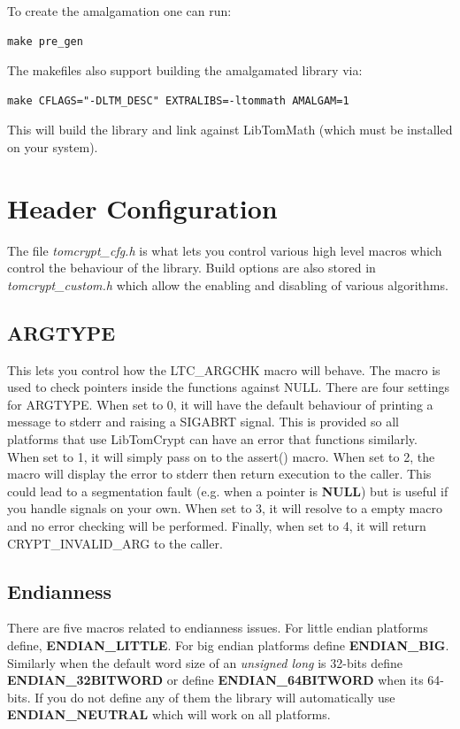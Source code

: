 \documentclass[synpaper]{book}
\newcommand{\mysection}[1]    %
	{                   %
	\section{#1}
   \markboth{\textsf{www.libtom.net}}{\thesection ~ {#1}}
	}
\begin{document}
To create the amalgamation one can run:

\begin{verbatim}
make pre_gen
\end{verbatim}

The makefiles also support building the amalgamated library via:

\begin{verbatim}
make CFLAGS="-DLTM_DESC" EXTRALIBS=-ltommath AMALGAM=1
\end{verbatim}

This will build the library and link against LibTomMath (which must be installed on your system).


\mysection{Header Configuration}
The file \textit{tomcrypt\_cfg.h} is what lets you control various high level macros which control the behaviour of the library.  Build options are also
stored in \textit{tomcrypt\_custom.h} which allow the enabling and disabling of various algorithms.

\subsection{ARGTYPE}
This lets you control how the LTC\_ARGCHK macro will behave.  The macro is used to check pointers inside the functions against
NULL.  There are four settings for ARGTYPE.  When set to 0, it will have the default behaviour of printing a message to
stderr and raising a SIGABRT signal.  This is provided so all platforms that use LibTomCrypt can have an error that functions
similarly.  When set to 1, it will simply pass on to the assert() macro.  When set to 2, the macro will display the error to
stderr then return execution to the caller.  This could lead to a segmentation fault (e.g. when a pointer is \textbf{NULL}) but is useful
if you handle signals on your own.  When set to 3, it will resolve to a empty macro and no error checking will be performed.  Finally, when set
to 4, it will return CRYPT\_INVALID\_ARG to the caller.

\subsection{Endianness}
There are five macros related to endianness issues.  For little endian platforms define, \textbf{ENDIAN\_LITTLE}.  For big endian
platforms define \textbf{ENDIAN\_BIG}.  Similarly when the default word size of an \textit{unsigned long} is 32-bits define \textbf{ENDIAN\_32BITWORD}
or define \textbf{ENDIAN\_64BITWORD} when its 64-bits.  If you do not define any of them the library will automatically use \textbf{ENDIAN\_NEUTRAL}
which will work on all platforms.
\end{document}
